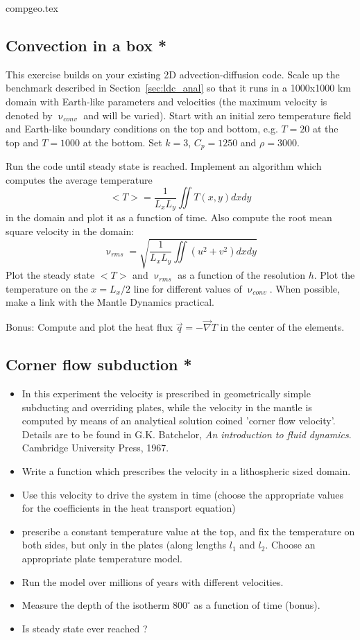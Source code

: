 \begin{flushright} {\tiny {\color{gray} compgeo.tex}} \end{flushright}

\subsection{Convection in a box *}

This exercise builds on your existing 2D advection-diffusion code. 
Scale up the benchmark described in Section~\ref{sec:ldc_anal} so that 
it runs in a 1000x1000 km domain with Earth-like parameters and velocities
(the maximum velocity is denoted by $\upnu_{conv}$ and will be varied).
Start with an initial zero temperature field and Earth-like boundary conditions 
on the top and bottom, e.g. $T=20$ at the top and $T=1000$ at the bottom. 
Set $k=3$, $C_p=1250$ and $\rho=3000$.

Run the code until steady state is reached. Implement an algorithm which computes the average 
temperature 
\[
<T> = \frac{1}{L_xL_y} \iint T(x,y) dx dy
\]
in the domain and plot it as a function of time.
Also compute the root mean square velocity in the domain:
\[
\upnu_{rms} = \sqrt{   \frac{1}{L_xL_y} \iint (u^2+v^2) dx dy  }
\]
Plot the steady state $<T>$ and $\upnu_{rms} $ as a function of the resolution $h$. 
Plot the temperature on the $x=L_x/2$ line for different values 
of $\upnu_{conv}$.
When possible, make a link with the Mantle Dynamics practical. 

Bonus: Compute and plot the heat flux $\vec{q}=-\vec\nabla T$ in the center of the elements.

\subsection{Corner flow subduction *}

\begin{itemize}
\item In this experiment the velocity is prescribed in geometrically simple subducting and overriding plates,
while the velocity in the mantle is computed by means of an analytical solution coined 'corner flow velocity'.
Details are to be found in G.K. Batchelor, {\it An introduction to fluid dynamics}. Cambridge University Press, 1967.
\item Write a function which prescribes the velocity in a lithospheric sized domain.
\item Use this velocity to drive the system in time (choose the appropriate values for the coefficients in the heat 
transport equation)
\item prescribe a constant temperature value at the top, and fix the temperature on both sides, but only in the 
plates (along lengths $l_1$ and $l_2$. Choose an appropriate plate temperature model.
\item Run the model over millions of years with different velocities.
\item Measure the depth of the isotherm $800^\circ$ as a function of time (bonus). 
\item Is steady state ever reached ?
\end{itemize}

